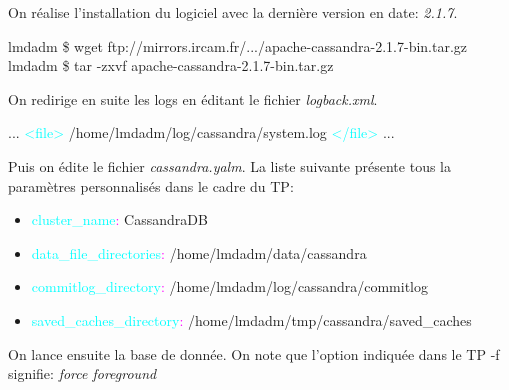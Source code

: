 \par On réalise l'installation du logiciel avec la dernière version en date: \textit{2.1.7}.\newline
\begin{tt}
lmdadm \$ wget ftp://mirrors.ircam.fr/.../apache-cassandra-2.1.7-bin.tar.gz \newline
lmdadm \$ tar -zxvf apache-cassandra-2.1.7-bin.tar.gz \newline
\end{tt}
On redirige en suite les logs en éditant le fichier \textit{logback.xml}. \newline
\begin{tt}
... \newline
\textcolor{cyan}{<file>} /home/lmdadm/log/cassandra/system.log \textcolor{cyan}{</file>} \newline
... \newline
\end{tt}
Puis on édite le fichier \textit{cassandra.yalm}. La liste suivante présente tous la paramètres personnalisés dans le cadre du TP:
\begin{itemize}
\item \textcolor{cyan}{cluster\_name}\textcolor{magenta}{:} CassandraDB
\item \textcolor{cyan}{data\_file\_directories}\textcolor{magenta}{:} /home/lmdadm/data/cassandra
\item \textcolor{cyan}{commitlog\_directory}\textcolor{magenta}{:} /home/lmdadm/log/cassandra/commitlog
\item \textcolor{cyan}{saved\_caches\_directory}\textcolor{magenta}{:} /home/lmdadm/tmp/cassandra/saved\_caches
\end{itemize}
On lance ensuite la base de donnée. On note que l'option indiquée dans le TP -f
signifie: \textit{force foreground}